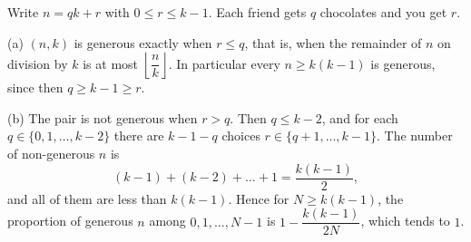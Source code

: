 Write $n=qk+r$ with $0\le r\le k-1$. Each friend gets $q$ chocolates and you get $r$.

(a) $(n,k)$ is generous exactly when $r\le q$, that is, when the remainder of $n$ on division by $k$ is at most $\left\lfloor\dfrac nk\right\rfloor$. In particular every $n\ge k(k-1)$ is generous, since then $q\ge k-1\ge r$.

(b) The pair is not generous when $r>q$. Then $q\le k-2$, and for each $q\in\{0,1,\dots,k-2\}$ there are $k-1-q$ choices $r\in\{q+1,\dots,k-1\}$. The number of non-generous $n$ is
\[(k-1)+(k-2)+\dots+1=\boxed{\dfrac{k(k-1)}2},\]
and all of them are less than $k(k-1)$. Hence for $N\ge k(k-1)$, the proportion of generous $n$ among $0,1,\dots,N-1$ is $1-\dfrac{k(k-1)}{2N}$, which tends to $1$.
